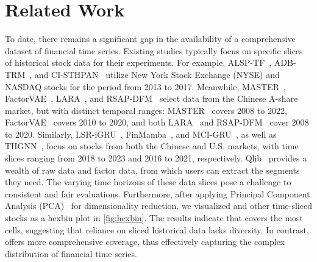\section{Related Work}
\label{sec:rela}


To date, there remains a significant gap in the availability of a comprehensive dataset of financial time series. Existing studies typically focus on specific slices of historical stock data for their experiments. For example, ALSP-TF~\cite{ALSP}, ADB-TRM~\cite{ADBTR}, and CI-STHPAN~\cite{cisthpan} utilize New York Stock Exchange (NYSE) and NASDAQ stocks for the period from 2013 to 2017. Meanwhile, MASTER~\cite{master}, FactorVAE~\cite{FactorVAE}, LARA~\cite{lara}, and RSAP-DFM~\cite{rsapdfm} select data from the Chinese A-share market, but with distinct temporal ranges: MASTER~\cite{master} covers 2008 to 2022, FactorVAE~\cite{FactorVAE} covers 2010 to 2020, and both LARA~\cite{lara} and RSAP-DFM~\cite{rsapdfm} cover 2008 to 2020. Similarly, LSR-iGRU~\cite{lsrigru}, FinMamba~\cite{finmamba}, and MCI-GRU~\cite{mcigru}, as well as THGNN~\cite{thgnn}, focus on stocks from both the Chinese and U.S. markets, with time slices ranging from 2018 to 2023 and 2016 to 2021, respectively. Qlib~\cite{qlib} provides a wealth of raw data and factor data, from which users can extract the segments they need.
The varying time horizons of these data slices pose a challenge to consistent and fair evaluations.
Furthermore, after applying Principal Component Analysis (PCA)~\cite{pca} for dimensionality reduction, we visualized \name and other time-sliced stocks as a hexbin plot in \cref{fig:hexbin}. The results indicate that \name covers the most cells, suggesting that reliance on sliced historical data lacks diversity. In contrast, \name offers more comprehensive coverage, thus effectively capturing the complex distribution of financial time series.